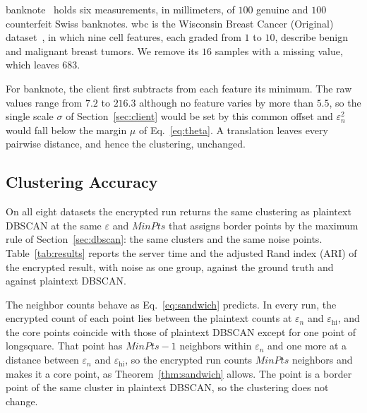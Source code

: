 banknote~\cite{flury1988multivariate} holds six measurements, in
millimeters, of $100$ genuine and $100$ counterfeit Swiss banknotes. wbc
is the Wisconsin Breast Cancer (Original)
dataset~\cite{wolberg1990breast}, in which nine cell features, each
graded from $1$ to $10$, describe benign and malignant breast tumors. We
remove its $16$ samples with a missing value, which leaves $683$.

For banknote, the client first subtracts from each feature its minimum.
The raw values range from $7.2$ to $216.3$ although no feature varies by
more than $5.5$, so the single scale $\sigma$ of
Section~\ref{sec:client} would be set by this common offset and
$\varepsilon_n^2$ would fall below the margin $\mu$ of
Eq.~\eqref{eq:theta}. A translation leaves every pairwise distance, and
hence the clustering, unchanged.

\subsection{Clustering Accuracy}
\label{sec:accuracy}

On all eight datasets the encrypted run returns the same clustering as
plaintext DBSCAN at the same $\varepsilon$ and $\mathit{MinPts}$ that
assigns border points by the maximum rule of Section~\ref{sec:dbscan}:
the same clusters and the same noise points.
Table~\ref{tab:results} reports the server time and the adjusted Rand
index (ARI) of the encrypted result, with noise as one group, against the
ground truth and against plaintext DBSCAN.

The neighbor counts behave as Eq.~\eqref{eq:sandwich} predicts. In every
run, the encrypted count of each point lies between the plaintext counts
at $\varepsilon_n$ and $\varepsilon_{\mathrm{hi}}$, and the core points
coincide with those of plaintext DBSCAN except for one point of
longsquare. That point has $\mathit{MinPts} - 1$ neighbors within
$\varepsilon_n$ and one more at a distance between $\varepsilon_n$ and
$\varepsilon_{\mathrm{hi}}$, so the encrypted run counts
$\mathit{MinPts}$ neighbors and makes it a core point, as
Theorem~\ref{thm:sandwich} allows. The point is a border point of the
same cluster in plaintext DBSCAN, so the clustering does not change.

